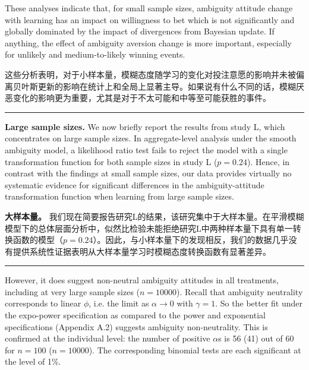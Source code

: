\documentclass[12pt,a4paper]{article}
\newenvironment{original}
  {\par\vspace{0.5em}\noindent\color{black}\ignorespaces}
  {\par\vspace{0.3em}}
\newenvironment{translation}
  {\par\noindent\color{transblue}\ignorespaces}
  {\par\vspace{0.8em}\hrule\vspace{0.5em}}
\begin{document}
\begin{original}
These analyses indicate that, for small sample sizes, ambiguity attitude change with learning has an impact on willingness to bet which is not significantly and globally dominated by the impact of divergences from Bayesian update. If anything, the effect of ambiguity aversion change is more important, especially for unlikely and medium-to-likely winning events.
\end{original}

\begin{translation}
这些分析表明，对于小样本量，模糊态度随学习的变化对投注意愿的影响并未被偏离贝叶斯更新的影响在统计上和全局上显著主导。如果说有什么不同的话，模糊厌恶变化的影响更为重要，尤其是对于不太可能和中等至可能获胜的事件。
\end{translation}

\begin{original}
\textbf{Large sample sizes.} We now briefly report the results from study L, which concentrates on large sample sizes. In aggregate-level analysis under the smooth ambiguity model, a likelihood ratio test fails to reject the model with a single transformation function for both sample sizes in study L ($p = 0.24$). Hence, in contrast with the findings at small sample sizes, our data provides virtually no systematic evidence for significant differences in the ambiguity-attitude transformation function when learning from large sample sizes.
\end{original}

\begin{translation}
\textbf{大样本量。} 我们现在简要报告研究L的结果，该研究集中于大样本量。在平滑模糊模型下的总体层面分析中，似然比检验未能拒绝研究L中两种样本量下具有单一转换函数的模型（$p = 0.24$）。因此，与小样本量下的发现相反，我们的数据几乎没有提供系统性证据表明从大样本量学习时模糊态度转换函数有显著差异。
\end{translation}

\begin{original}
However, it does suggest non-neutral ambiguity attitudes in all treatments, including at very large sample sizes ($n = 10000$). Recall that ambiguity neutrality corresponds to linear $\phi$, i.e. the limit as $\alpha \to 0$ with $\gamma = 1$. So the better fit under the expo-power specification as compared to the power and exponential specifications (Appendix A.2) suggests ambiguity non-neutrality. This is confirmed at the individual level: the number of positive $\alpha$s is 56 (41) out of 60 for $n = 100$ ($n = 10000$). The corresponding binomial tests are each significant at the level of 1\%.
\end{original}
\end{document}
